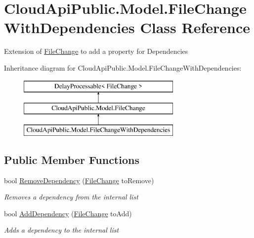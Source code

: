 \hypertarget{class_cloud_api_public_1_1_model_1_1_file_change_with_dependencies}{\section{Cloud\-Api\-Public.\-Model.\-File\-Change\-With\-Dependencies Class Reference}
\label{class_cloud_api_public_1_1_model_1_1_file_change_with_dependencies}
}


Extension of \hyperlink{class_cloud_api_public_1_1_model_1_1_file_change}{File\-Change} to add a property for Dependencies  


Inheritance diagram for Cloud\-Api\-Public.\-Model.\-File\-Change\-With\-Dependencies\-:\begin{figure}[H]
\begin{center}
\leavevmode
\includegraphics[height=3.000000cm]{class_cloud_api_public_1_1_model_1_1_file_change_with_dependencies}
\end{center}
\end{figure}
\subsection*{Public Member Functions}
\begin{DoxyCompactItemize}
\item 
bool \hyperlink{class_cloud_api_public_1_1_model_1_1_file_change_with_dependencies_ad070334b4c53167808eabbc6add69ebf}{Remove\-Dependency} (\hyperlink{class_cloud_api_public_1_1_model_1_1_file_change}{File\-Change} to\-Remove)
\begin{DoxyCompactList}\small\item\em Removes a dependency from the internal list \end{DoxyCompactList}\item 
bool \hyperlink{class_cloud_api_public_1_1_model_1_1_file_change_with_dependencies_a213ce7368c054612a2c1d5f2445cac4e}{Add\-Dependency} (\hyperlink{class_cloud_api_public_1_1_model_1_1_file_change}{File\-Change} to\-Add)
\begin{DoxyCompactList}\small\item\em Adds a dependency to the internal list \end{DoxyCompactList}\end{DoxyCompactItemize}
